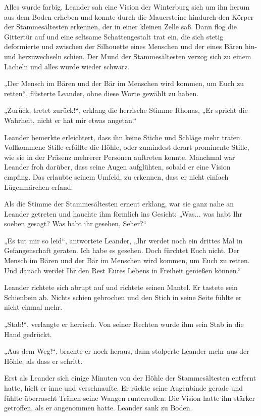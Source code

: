 Alles wurde farbig. Leander sah eine Vision der Winterburg sich um ihn herum aus dem Boden erheben und konnte durch die Mauersteine hindurch den Körper der Stammesältesten erkennen, der in einer kleinen Zelle saß. Dann flog die Gittertür auf und eine seltsame Schattengestalt trat ein, die sich stetig deformierte und zwischen der Silhouette eines Menschen und der eines Bären hin- und herzuwechseln schien. Der Mund der Stammesältesten verzog sich zu einem Lächeln und alles wurde wieder schwarz.

„Der Mensch im Bären und der Bär im Menschen wird kommen, um Euch zu retten“, flüsterte Leander, ohne diese Worte gewählt zu haben.

„Zurück, tretet zurück!“, erklang die herrische Stimme Rhonas, „Er spricht die Wahrheit, nicht er hat mir etwas angetan.“

Leander bemerkte erleichtert, dass ihn keine Stiche und Schläge mehr trafen. Vollkommene Stille erfüllte die Höhle, oder zumindest derart prominente Stille, wie sie in der Präsenz mehrerer Personen auftreten konnte. Manchmal war Leander froh darüber, dass seine Augen aufglühten, sobald er eine Vision empfing. Das erlaubte seinem Umfeld, zu erkennen, dass er nicht einfach Lügenmärchen erfand.

Als die Stimme der Stammesältesten erneut erklang, war sie ganz nahe an Leander getreten und hauchte ihm förmlich ins Gesicht: „Was... was habt Ihr soeben gesagt? Was habt ihr gesehen, Seher?“

„Es tut mir so leid“, antwortete Leander, „Ihr werdet noch ein drittes Mal in Gefangenschaft geraten. Ich habe es gesehen. Doch fürchtet Euch nicht. Der Mensch im Bären und der Bär im Menschen wird kommen, um Euch zu retten. Und danach werdet Ihr den Rest Eures Lebens in Freiheit genießen können.“

Leander richtete sich abrupt auf und richtete seinen Mantel. Er tastete sein Schienbein ab. Nichts schien gebrochen und den Stich in seine Seite fühlte er nicht einmal mehr.

„Stab!“, verlangte er herrisch. Von seiner Rechten wurde ihm sein Stab in die Hand gedrückt.

„Aus dem Weg!“, brachte er noch heraus, dann stolperte Leander mehr aus der Höhle, als dass er schritt.



\trennzeichen



Erst als Leander sich einige Minuten von der Höhle der Stammesältesten entfernt hatte, hielt er inne und verschnaufte. Er rückte seine Augenbinde gerade und fühlte überrascht Tränen seine Wangen runterrollen. Die Vision hatte ihn stärker getroffen, als er angenommen hatte. Leander sank zu Boden.

